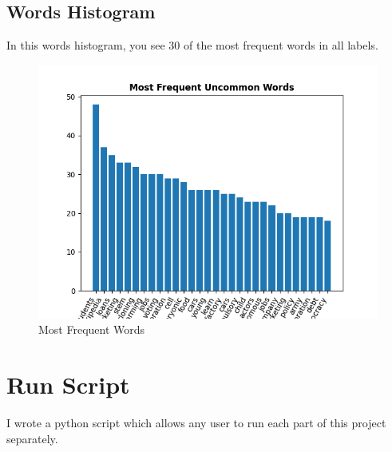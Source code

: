 \subsection{Words Histogram}
In this words histogram, you see 30 of the most frequent words in all labels. \\
\begin{figure}[H]
	\begin{center}
		\includegraphics[width=\linewidth]{../stats/words_histogram.png}
		\caption{Most Frequent Words}
	\end{center}
\end{figure}

\section{Run Script}
I wrote a python script which allows any user to run each part of this project separately. \\